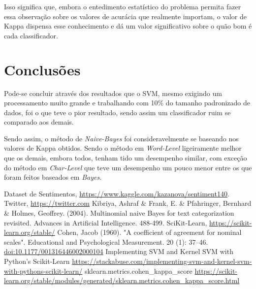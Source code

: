 \documentclass[conference]{IEEEtran}
\begin{document}
Isso significa que, embora o entedimento estatístico do problema permita fazer essa observação sobre os valores de acurácia que realmente importam, o valor de Kappa dispensa esse conhecimento e dá um valor significativo sobre o quão bom é cada classificador.

\section{Conclusões}

Pode-se concluir através dos resultados que o SVM, mesmo exigindo um processamento muito grande e trabalhando com 10\% do tamanho padronizado de dados, foi o que teve o pior resultado, sendo assim um classificador ruim se comparado aos demais.

Sendo assim, o método de \textit{Naive-Bayes} foi consideravelmente se baseando nos valores de Kappa obtidos. Sendo o método em \textit{Word-Level} ligeiramente melhor que os demais, embora todos, tenham tido um desempenho similar, com exceção do método em \textit{Char-Level} que teve um desempenho um pouco menor entre os que foram feitos baseados em \textit{Bayes}.

\begin{thebibliography}{00}
 Dataset de Sentimentos, \url{https://www.kaggle.com/kazanova/sentiment140}.
 Twitter, \url{https://twitter.com}
 Kibriya, Ashraf \& Frank, E. \& Pfahringer, Bernhard \& Holmes, Geoffrey. (2004). Multinomial naive Bayes for text categorization revisited. Advances in Artificial Intelligence. 488-499. \label{kibriya}
 SciKit-Learn, \url{https://scikit-learn.org/stable/}
 Cohen, Jacob (1960). "A coefficient of agreement for nominal scales". Educational and Psychological Measurement. 20 (1): 37–46. \url{doi:10.1177/001316446002000104}
 Implementing SVM and Kernel SVM with Python's Scikit-Learn \url{https://stackabuse.com/implementing-svm-and-kernel-svm-with-pythons-scikit-learn/}
 sklearn.metrics.cohen\_kappa\_score \url{https://scikit-learn.org/stable/modules/generated/sklearn.metrics.cohen_kappa_score.html}

\end{thebibliography}
\end{document}
